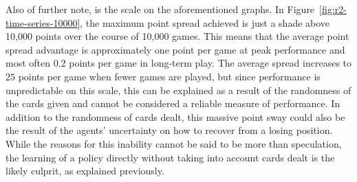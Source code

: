 Also of further note, is the scale on the aforementioned graphs.
%
In Figure~\ref{fig:r2-time-series-10000},
the maximum point spread achieved is just a shade above 10,000 points
over the course of 10,000 games.
%
This means that the average point spread advantage is approximately 
one point per game at peak performance\textemdash
and most often $0.2$ points per game\textemdash
in long-term play.
%
The average spread increases to $25$ points per game when fewer games are 
played,
but since performance is unpredictable on this scale,
this can be explained as a result of the randomness of the cards given
and cannot be considered a reliable measure of performance.
%
In addition to the randomness of cards dealt,
this massive point sway could also be the result of the agents' uncertainty on 
how to recover from a losing position.
%
While the reasons for this inability cannot be said to be more than speculation,
the learning of a policy directly without taking into account cards dealt
is the likely culprit,
as explained previously.


